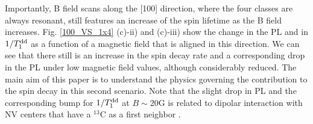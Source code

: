\documentclass[preprintnumbers,amsmath,amssymb,superscriptaddress,twocolumn,showpacs]{revtex4-2}
\begin{document}
Importantly, B field scans along the [100] direction, where the four classes are always resonant, still features an increase of the spin lifetime as the B field increases. Fig. \ref{100_VS_1x4} (c)-ii) and (c)-iii) show the change in the PL and in $1/T_1^{\rm dd}$ as a function of a magnetic field that is aligned in this direction. We can see that there still is an increase in the spin decay rate and a corresponding drop in the PL under low magnetic field values, although considerably reduced. 
The main aim of this paper is to understand the physics governing the contribution to the spin decay in this second scenario. Note that the slight drop in PL and the corresponding bump for $1/T_1^{\rm dd}$ at $B \sim 20$G is related to dipolar interaction with NV centers that have a $^{13}$C as a first neighbor \cite{pellet2021optical}. 
\end{document}
